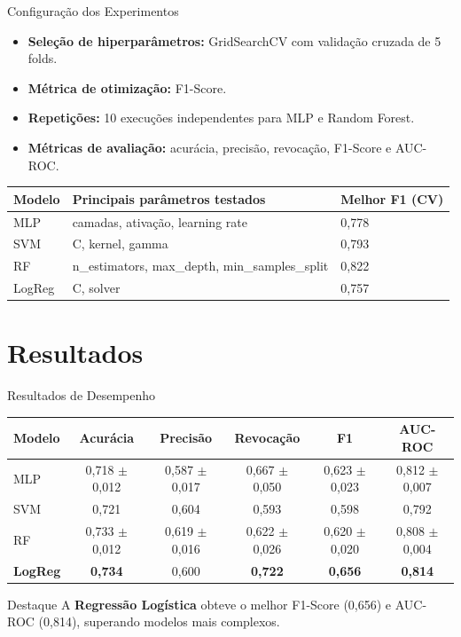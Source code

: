 \documentclass[10pt]{beamer}
\begin{document}
\begin{frame}{Configuração dos Experimentos}
    \begin{itemize}
        \item \textbf{Seleção de hiperparâmetros:} GridSearchCV com validação cruzada de 5 folds.
        \item \textbf{Métrica de otimização:} F1-Score.
        \item \textbf{Repetições:} 10 execuções independentes para MLP e Random Forest.
        \item \textbf{Métricas de avaliação:} acurácia, precisão, revocação, F1-Score e AUC-ROC.
    \end{itemize}
    \vspace{0.3cm}
    \centering
    \footnotesize
    \begin{tabular}{@{}lll@{}}
        \toprule
        \textbf{Modelo} & \textbf{Principais parâmetros testados} & \textbf{Melhor F1 (CV)} \\
        \midrule
        MLP & camadas, ativação, learning rate & 0,778 \\
        SVM & C, kernel, gamma & 0,793 \\
        RF & n\_estimators, max\_depth, min\_samples\_split & 0,822 \\
        LogReg & C, solver & 0,757 \\
        \bottomrule
    \end{tabular}
\end{frame}

\section{Resultados}
\begin{frame}{Resultados de Desempenho}
    \centering
    \footnotesize
    \begin{tabular}{@{}lccccc@{}}
        \toprule
        \textbf{Modelo} & \textbf{Acurácia} & \textbf{Precisão} & \textbf{Revocação} & \textbf{F1} & \textbf{AUC-ROC} \\
        \midrule
        MLP & 0,718 $\pm$ 0,012 & 0,587 $\pm$ 0,017 & 0,667 $\pm$ 0,050 & 0,623 $\pm$ 0,023 & 0,812 $\pm$ 0,007 \\
        SVM & 0,721 & 0,604 & 0,593 & 0,598 & 0,792 \\
        RF & 0,733 $\pm$ 0,012 & 0,619 $\pm$ 0,016 & 0,622 $\pm$ 0,026 & 0,620 $\pm$ 0,020 & 0,808 $\pm$ 0,004 \\
        \textbf{LogReg} & \textbf{0,734} & 0,600 & \textbf{0,722} & \textbf{0,656} & \textbf{0,814} \\
        \bottomrule
    \end{tabular}
    \vspace{0.4cm}
    \begin{block}{Destaque}
        A \textbf{Regressão Logística} obteve o melhor F1-Score (0,656) e AUC-ROC (0,814), superando modelos mais complexos.
    \end{block}
\end{frame}
\end{document}
